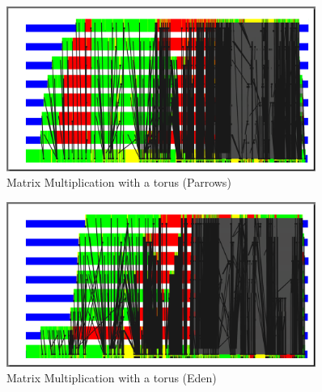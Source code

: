 \begin{figure}[ht]
	\centering
	\includegraphics[width=0.9\textwidth]{images/torus_matrix_parrows}
	\caption[without Futures]{Matrix Multiplication with a torus (Parrows)}
\end{figure}

\begin{figure}[ht]
	\centering
	\includegraphics[width=0.9\textwidth]{images/torus_matrix_eden}
	\caption[with Futures]{Matrix Multiplication with a torus (Eden)}
\end{figure}